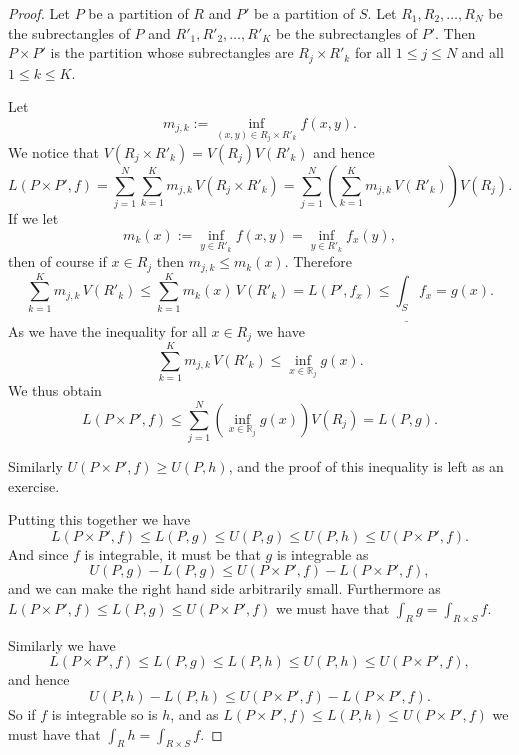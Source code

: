 \documentclass[12pt]{book}
\newcommand{\R}{{\mathbb{R}}}
\theoremstyle{plain}
\theoremstyle{remark}
\theoremstyle{definition}
\theoremstyle{exercise}
\theoremstyle{example}
\begin{document}
\begin{proof}
Let $P$ be a partition of $R$ and $P'$ be a partition of $S$.  Let
$R_1,R_2,\ldots,R_N$ be the subrectangles of $P$ and
$R'_1,R'_2,\ldots,R'_K$ be the subrectangles of $P'$.  Then
$P \times P'$ is the partition whose subrectangles are
$R_j \times R'_k$ for all $1 \leq j \leq N$ and all $1 \leq k \leq K$.

Let
\begin{equation*}
m_{j,k} :=
\inf_{(x,y) \in R_j \times R'_k} f(x,y) .
\end{equation*}
We notice that
$V(R_j \times R'_k) = V(R_j)V(R'_k)$ and hence
\begin{equation*}
L(P \times P',f) =
\sum_{j=1}^N
\sum_{k=1}^K
m_{j,k} \, V(R_j \times R'_k)
=
\sum_{j=1}^N
\left(
\sum_{k=1}^K
m_{j,k} \, V(R'_k) \right) V(R_j) .
\end{equation*}
If we let
\begin{equation*}
m_k(x) := \inf_{y \in R'_k} f(x,y) = \inf_{y \in R'_k} f_x(y) ,
\end{equation*}
then of course if $x \in R_j$ then $m_{j,k} \leq m_k(x)$.  Therefore
\begin{equation*}
\sum_{k=1}^K
m_{j,k} \, V(R'_k)
\leq \sum_{k=1}^K m_k(x) \, V(R'_k) = L(P',f_x) \leq
\underline{\int_S} f_x = g(x) .
\end{equation*}
As we have the inequality for all $x \in R_j$ we have
\begin{equation*}
\sum_{k=1}^K
m_{j,k} \, V(R'_k)
\leq \inf_{x \in \R_j} g(x) .
\end{equation*}
We thus obtain
\begin{equation*}
L(P \times P',f) 
\leq
\sum_{j=1}^N
\left(
\inf_{x \in \R_j} g(x)
\right) V(R_j) = L(P,g) .
\end{equation*}

Similarly $U(P \times P',f) \geq U(P,h)$, and the proof of this inequality is
left as an exercise.

Putting this together we have
\begin{equation*}
L(P \times P',f)
\leq
L(P,g) \leq
U(P,g) \leq
U(P,h) \leq
U(P \times P',f) .
\end{equation*}
And since $f$ is integrable, it must be that $g$ is integrable as
\begin{equation*}
U(P,g) - L(P,g)
\leq
U(P \times P',f) -
L(P \times P',f) ,
\end{equation*}
and we can make the right hand side arbitrarily small.  Furthermore
as 
$L(P \times P',f) \leq L(P,g) \leq U(P \times P',f)$ we must have
that $\int_R g = \int_{R \times S} f$.

Similarly we have
\begin{equation*}
L(P \times P',f)
\leq
L(P,g) \leq
L(P,h) \leq
U(P,h) \leq
U(P \times P',f) ,
\end{equation*}
and hence
\begin{equation*}
U(P,h) - L(P,h)
\leq
U(P \times P',f) -
L(P \times P',f) .
\end{equation*}
So if $f$ is integrable so is $h$, and
as $L(P \times P',f) \leq L(P,h) \leq U(P \times P',f)$ we must have
that $\int_R h = \int_{R \times S} f$.
\end{proof}
\end{document}
